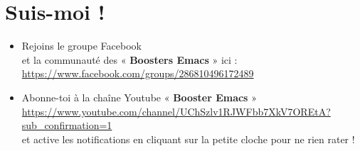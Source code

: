 \documentclass[french]{report}
\begin{document}
\chapter{Suis-moi !}
\label{sec:orgcd75b43}

\begin{itemize}
\item Rejoins le groupe Facebook \\
et la communauté des « \textbf{Boosters Emacs} » ici : \\
\url{https://www.facebook.com/groups/286810496172489}

\item Abonne-toi à la chaîne Youtube « \textbf{Booster Emacs} » \\
\url{https://www.youtube.com/channel/UChSzlv1RJWFbb7XkV7OREtA?sub\_confirmation=1} \\
et active les notifications en cliquant sur la petite cloche pour ne rien
rater !
\end{itemize}
\end{document}
